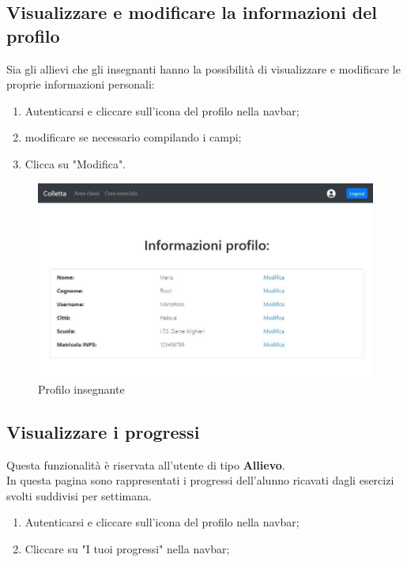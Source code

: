 \documentclass[11pt,a4paper]{article}
\begin{document}
{	\subsection{Visualizzare e modificare la informazioni del profilo}
	Sia gli allievi che gli insegnanti hanno la possibilità di visualizzare e modificare le proprie informazioni personali:
	\begin{enumerate}
		\item Autenticarsi e cliccare sull'icona del profilo nella navbar;
		\item modificare se necessario compilando i campi;
		\item Clicca su "Modifica".
	\end{enumerate}
\newpage
	\begin{figure}[h]
		\centering
		\includegraphics[scale=0.65]{images/profiloinsegnante.jpg}
		\caption{Profilo insegnante}
	\end{figure}
	
	
	\subsection{Visualizzare i progressi}
	Questa funzionalità è riservata all'utente di tipo \textbf{Allievo}.\\
	In questa pagina sono rappresentati i progressi dell'alunno ricavati dagli esercizi svolti suddivisi per settimana.
	
	\begin{enumerate}
		\item Autenticarsi e cliccare sull'icona del profilo nella navbar;
		\item Cliccare su "I tuoi progressi" nella navbar;
	\end{enumerate}

}
\end{document}
